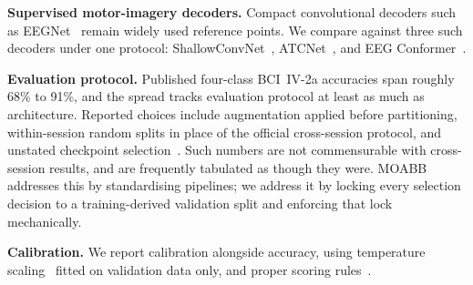 \textbf{Supervised motor-imagery decoders.}
Compact convolutional decoders such as
EEGNet~\cite{lawhern2018eegnet} remain widely used reference points. We compare
against three such decoders under one protocol:
ShallowConvNet~\cite{schirrmeister2017deep}, ATCNet~\cite{altaheri2023atcnet},
and EEG Conformer~\cite{song2023conformer}.

\textbf{Evaluation protocol.}
Published four-class BCI~IV-2a accuracies span roughly 68\% to 91\%, and the
spread tracks evaluation protocol at least as much as architecture. Reported
choices include augmentation applied before partitioning, within-session random
splits in place of the official cross-session protocol, and unstated checkpoint
selection~\cite{yu2022lffn}. Such numbers are not commensurable with
cross-session results, and are frequently tabulated as though they were.
MOABB~\cite{jayaram2018moabb} addresses this by standardising
pipelines; we address it by locking every selection decision to a
training-derived validation split and enforcing that lock mechanically.

\textbf{Calibration.}
We report calibration alongside accuracy, using temperature
scaling~\cite{guo2017calibration} fitted on validation data only, and proper
scoring rules~\cite{brier1950verification,gneiting2007proper}.
